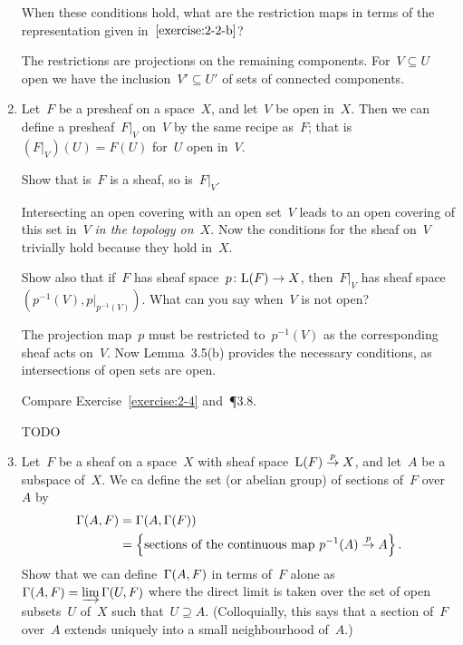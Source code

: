 \documentclass[a4paper,11pt,oneside,openany,article]{memoir}
\begin{document}
\begin{enumerate}
    When these conditions hold, what are the restriction maps in terms of the representation given in~$\ref{exercise:2-2-b}$?

    \begin{solution}
      The restrictions are projections on the remaining components. For~$V\subseteq U$ open we have the inclusion~$V'\subseteq U'$ of sets of connected components.
    \end{solution}

  \item Let~$F$ be a presheaf on a space~$X$, and let~$V$ be open in~$X$. Then we can define a presheaf~$F|_V$ on~$V$ by the same recipe as~$F$; that is~$(F|_V)(U)=F(U)$ for~$U$ open in~$V$.

    Show that is~$F$ is a sheaf, so is~$F|_V$.

    \begin{solution}
      Intersecting an open covering with an open set~$V$ leads to an open covering of this set in~$V$ \emph{in the topology on~$X$}. Now the conditions for the sheaf on~$V$ trivially hold because they hold in~$X$.
    \end{solution}

    Show also that if~$F$ has sheaf space~$p\colon \mathrm{L}(F)\to X$, then~$F|_V$ has sheaf space $(p^{-1}(V),p|_{p^{-1}(V)})$. What can you say when~$V$ is not open?

    \begin{solution}
      The projection map~$p$ must be restricted to~$p^{-1}(V)$ as the corresponding sheaf acts on~$V$. Now Lemma~3.5(b) provides the necessary conditions, as intersections of open sets are open.
    \end{solution}

    Compare Exercise~\ref{exercise:2-4} and~\P3.8.

    \begin{solution}
      TODO
    \end{solution}

  \item\label{exercise:2-4} Let~$F$ be a sheaf on a space~$X$ with sheaf space~$\mathrm{L}(F)\overset{p}{\rightarrow} X$, and let~$A$ be a subspace of~$X$. We ca define the set (or abelian group) of sections of~$F$ over~$A$ by
    \begin{align}
      \mathrm{\Gamma}(A,F)&=\mathrm{\Gamma}(A,\mathrm{\Gamma}(F)) \\
      &=\left\{ \text{sections of the continuous map $p^{-1}(A)\overset{p}{\rightarrow}A$} \right\}.
    \end{align}
    Show that we can define~$\mathrm{\Gamma}(A,F)$ in terms of~$F$ alone as~$\mathrm{\Gamma}(A,F)=\varinjlim\mathrm{\Gamma}(U,F)$ where the direct limit is taken over the set of open subsets~$U$ of~$X$ such that~$U\supseteq A$. (Colloquially, this says that a section of~$F$ over~$A$ extends uniquely into a small neighbourhood of~$A$.)


\end{enumerate}
\end{document}
